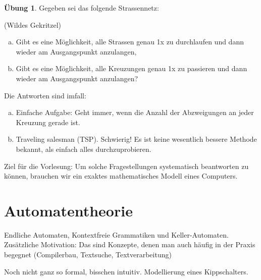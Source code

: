 \documentclass[11pt]{article} %
\theoremstyle{definition}
\newtheorem*{ubung}{Übung}
\begin{document}
\begin{ubung}

Gegeben sei das folgende Strassennetz:

(Wildes Gekritzel)

\begin{enumerate}[(a)]
\item Gibt es eine Möglichkeit, alle Strassen genau 1x zu durchlaufen und dann wieder am Ausgangspunkt anzulangen,
\item Gibt es eine Möglichkeit, alle Kreuzungen genau 1x zu passieren und dann wieder am Ausgangspunkt anzulangen?
\end{enumerate}

Die Antworten sind imfall:
\begin{enumerate}[(a)]
\item Einfache Aufgabe: Geht immer, wenn die Anzahl der Abzweigungen an jeder Kreuzung gerade ist.
\item Traveling salesman (TSP). Schwierig! Es ist keine wesentlich bessere Methode bekannt, als einfach alles durchzuprobieren.
\end{enumerate}

\end{ubung}

Ziel für die Vorlesung: Um solche Fragestellungen systematisch beantworten zu können, brauchen wir ein exaktes mathematisches Modell eines Computers.

\section{Automatentheorie}

Endliche Automaten, Kontextfreie Grammatiken und Keller-Automaten. Zusätzliche Motivation: Das sind Konzepte, denen man auch häufig in der Praxis begegnet (Compilerbau, Textsuche, Textverarbeitung)

Noch nicht ganz so formal, bisschen intuitiv. Modellierung eines Kippschalters.

\begin{center}
\end{center}
\end{document}
